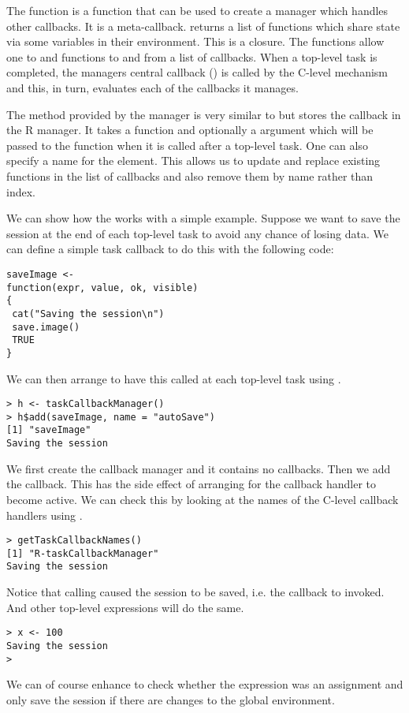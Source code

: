 \documentclass{article}
\begin{document}
The function  is a function that can be
used to create a manager which handles other callbacks. It is a
meta-callback.   returns a list of
functions which share state via some variables in their environment.
This is a closure.  The functions allow one to  and
 functions to and from a list of callbacks.
When a top-level task is completed, the managers central
callback () is called by the C-level mechanism
and this, in turn, evaluates each of the callbacks it manages.

The  method provided by the manager is very similar to
 but stores the callback in the R manager.
It takes a function and optionally a  argument which will
be passed to the function when it is called after a top-level task.
One can also specify a name for the element.  This allows us to update
and replace existing functions in the list of callbacks and also
remove them by name rather than index.

We can show how the  works with a
simple example.  Suppose we want to save the session at the end of
each top-level task to avoid any chance of losing data.  We can define
a simple task callback to do this with the following code:
\begin{verbatim}
saveImage <-
function(expr, value, ok, visible)
{
 cat("Saving the session\n")
 save.image()
 TRUE
}  
\end{verbatim}

We can then arrange to have this called at each top-level task using
.
\begin{verbatim}
> h <- taskCallbackManager()
> h$add(saveImage, name = "autoSave")
[1] "saveImage"
Saving the session
\end{verbatim}%
We first create the callback manager and it contains no callbacks.
Then we add the  callback. This has the side
effect of arranging for the callback handler to become active.  We can
check this by looking at the names of the C-level callback handlers
using .
\begin{verbatim}
> getTaskCallbackNames()
[1] "R-taskCallbackManager"
Saving the session
\end{verbatim}
Notice that calling 
caused the session to be saved, i.e. the callback to invoked.
And other top-level expressions will do the same.
\begin{verbatim}
> x <- 100
Saving the session
> 
\end{verbatim}
We can of course enhance  to check whether the
expression was an assignment and only save the session if there are
changes to the global environment.
\end{document}
